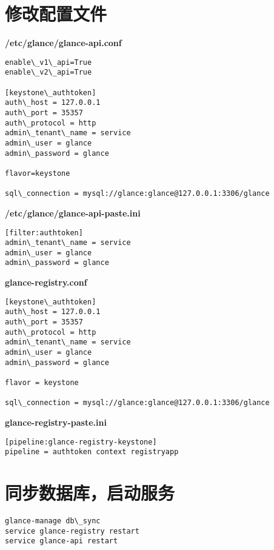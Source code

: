 \documentclass[letterpaper,10pt,english]{sphinxmanual}
\begin{document}
\section{修改配置文件}
\label{glance:id3}
\textbf{/etc/glance/glance-api.conf}

\begin{Verbatim}[commandchars=\\\{\}]
enable\_v1\_api=True
enable\_v2\_api=True

[keystone\_authtoken]
auth\_host = 127.0.0.1
auth\_port = 35357
auth\_protocol = http
admin\_tenant\_name = service
admin\_user = glance
admin\_password = glance

flavor=keystone

sql\_connection = mysql://glance:glance@127.0.0.1:3306/glance
\end{Verbatim}

\textbf{/etc/glance/glance-api-paste.ini}

\begin{Verbatim}[commandchars=\\\{\}]
[filter:authtoken]
admin\_tenant\_name = service
admin\_user = glance
admin\_password = glance
\end{Verbatim}

\textbf{glance-registry.conf}

\begin{Verbatim}[commandchars=\\\{\}]
[keystone\_authtoken]
auth\_host = 127.0.0.1
auth\_port = 35357
auth\_protocol = http
admin\_tenant\_name = service
admin\_user = glance
admin\_password = glance

flavor = keystone

sql\_connection = mysql://glance:glance@127.0.0.1:3306/glance
\end{Verbatim}

\textbf{glance-registry-paste.ini}

\begin{Verbatim}[commandchars=\\\{\}]
[pipeline:glance-registry-keystone]
pipeline = authtoken context registryapp
\end{Verbatim}


\section{同步数据库，启动服务}
\label{glance:id4}
\begin{Verbatim}[commandchars=\\\{\}]
glance-manage db\_sync
service glance-registry restart
service glance-api restart
\end{Verbatim}
\end{document}
